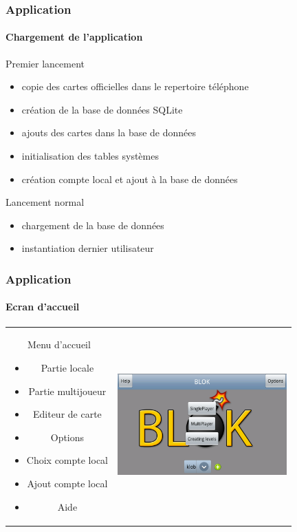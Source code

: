 	\begin{frame}
	\frametitle{Application}
	\framesubtitle{Chargement de l'application}
		\begin{block}{Premier lancement}
			\begin{itemize}
			 	\item copie des cartes officielles dans le repertoire téléphone 
				\item création de la base de données SQLite
				\item ajouts des cartes dans la base de données
				\item initialisation des tables	systèmes
				\item création compte local et ajout à la base de données
			\end{itemize}
		\end{block}
				
		\begin{block}{Lancement normal}
			\begin{itemize}
				\item chargement de la base de données 
				\item instantiation dernier utilisateur
			\end{itemize}
		\end{block}
	
	\end{frame}
	
	
	\begin{frame}
	\frametitle{Application}
	\framesubtitle{Ecran d'accueil}
		\begin{center}
		\begin{tabular}{cc}
			\begin{minipage}{4cm}
		
				Menu d'accueil
				\begin{itemize}
					\item Partie locale
					\item Partie multijoueur
					\item Editeur de carte
					\item Options
					\item Choix compte local
					\item Ajout compte local
					\item Aide
				\end{itemize}
			\end{minipage}  &		
			\begin{minipage}{8cm}
				\includegraphics[width=6.5cm]{img/2.png} 
			\end{minipage}\\
		\end{tabular}
		\end{center}
	
	\end{frame}
	

